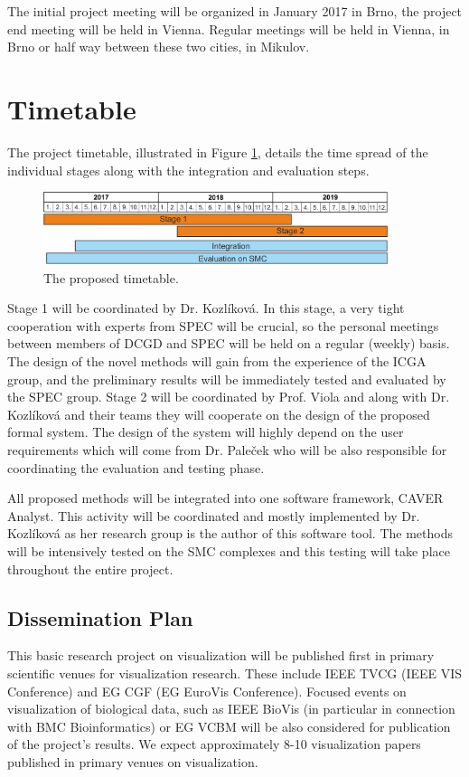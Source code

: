 \documentclass[11pt,a4paper,titlepage,oneside,onecolumn]{article}
\begin{document}
The initial project meeting will be organized in January 2017 in Brno, the project end meeting will be held in Vienna. 
Regular meetings will be held in Vienna, in Brno or half way between these two cities, in Mikulov.


\section{Timetable}
\label{sec:Timetable}

The project timetable, illustrated in Figure \ref{timetable}, details the time spread of the individual stages along with the integration and evaluation steps.
 
\begin{figure}[t]
\centering
\includegraphics[width=0.9\textwidth]{pics/timeline.png}
\caption{The proposed timetable.}
\label{timetable}
\end{figure}

Stage 1 will be coordinated by Dr. Kozl\'{i}kov\'{a}. 
In this stage, a very tight cooperation with experts from SPEC will be crucial, so the personal meetings between members of DCGD and SPEC will be held on a regular (weekly) basis. 
The design of the novel methods will gain from the experience of the ICGA group, and the preliminary results will be immediately tested and evaluated by the SPEC group. 
Stage 2 will be coordinated by Prof. Viola and along with Dr. Kozl\'{i}kov\'{a} and their teams they will cooperate on the design of the proposed formal system. 
The design of the system will highly depend on the user requirements which will come from Dr. Pale\v{c}ek who will be also responsible for coordinating the evaluation and testing phase.

All proposed methods will be integrated into one software framework, CAVER Analyst. This activity will be coordinated and mostly implemented by Dr. Kozl\'{i}kov\'{a} as her research group is the author of this software tool. The methods will be intensively tested on the SMC complexes and this testing will take place throughout the entire project.

\subsection{Dissemination Plan}
This basic research project on visualization will be published first in primary scientific venues for visualization research. These include IEEE TVCG (IEEE VIS Conference) and EG CGF (EG EuroVis Conference). Focused events on visualization of biological data, such as IEEE BioVis (in particular in connection with BMC Bioinformatics) or EG VCBM will be also considered for publication of the project's results. We expect approximately 8-10 visualization papers published in primary venues on visualization.
\end{document}
